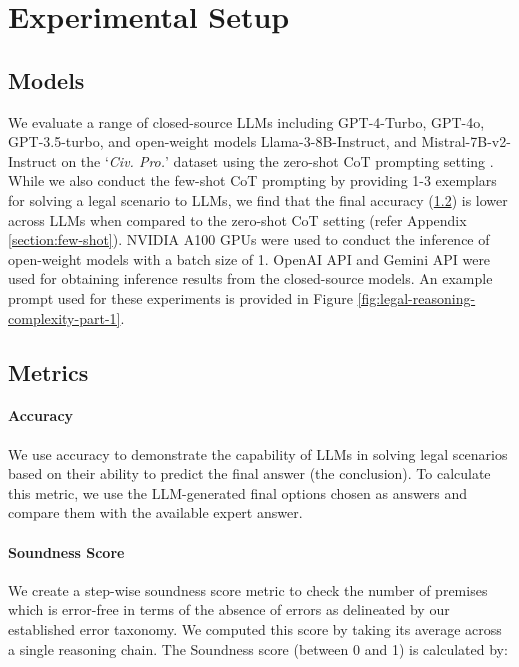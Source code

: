 \section{Experimental Setup}
\label{sec:experiments}

\subsection{Models}
We evaluate a range of closed-source LLMs including GPT-4-Turbo, GPT-4o, GPT-3.5-turbo, and open-weight models Llama-3-8B-Instruct, and Mistral-7B-v2-Instruct on the `\textit{Civ. Pro.}' dataset using the zero-shot CoT prompting setting
\citep{wei2023chainofthoughtpromptingelicitsreasoning, kojima2023largelanguagemodelszeroshot}. While we also conduct the few-shot CoT prompting by providing 1-3 exemplars for solving a legal scenario to LLMs, we find that the final accuracy (\textsection \ref{section: metrics}) is lower across LLMs when compared to the zero-shot CoT setting (refer Appendix \ref{section:few-shot}). NVIDIA A100 GPUs were used to conduct the inference of open-weight models with a batch size of 1. OpenAI API and Gemini API were used for obtaining inference results from the closed-source models. An example prompt used for these experiments is provided in Figure \ref{fig:legal-reasoning-complexity-part-1}.

\subsection{Metrics}
\label{section: metrics}
\paragraph{Accuracy} We use accuracy to demonstrate the capability of LLMs in solving legal scenarios based on their ability to predict the final answer (the conclusion). To calculate this metric, we use the LLM-generated final options chosen as answers and compare them with the available expert answer. 

\paragraph{Soundness Score} We create a step-wise soundness score metric to check the number of premises which is error-free in terms of the absence of errors as delineated by our established error taxonomy. We computed this score by taking its average across a single reasoning chain. The Soundness score (between 0 and 1) is calculated by:

